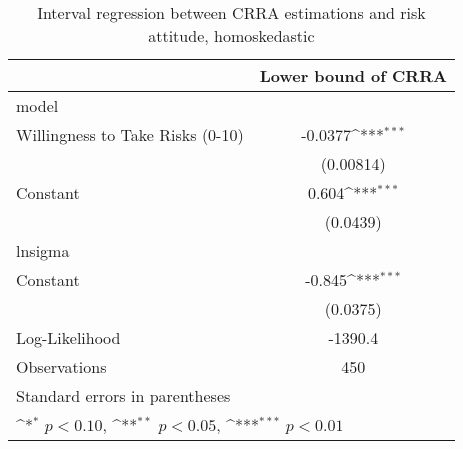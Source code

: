 \begin{table}[htbp]\centering
\def\sym#1{\ifmmode^{#1}\else\(^{#1}\)\fi}
\caption{Interval regression between CRRA estimations and risk attitude, homoskedastic}
\begin{tabular}{l*{1}{c}}
\hline\hline
                    &\multicolumn{1}{c}{Lower bound of CRRA}\\
\hline
model               &                     \\
Willingness to Take Risks (0-10)&     -0.0377\sym{***}\\
                    &   (0.00814)         \\
[1em]
Constant            &       0.604\sym{***}\\
                    &    (0.0439)         \\
\hline
lnsigma             &                     \\
Constant            &      -0.845\sym{***}\\
                    &    (0.0375)         \\
\hline
Log-Likelihood      &     -1390.4         \\
Observations        &         450         \\
\hline\hline
\multicolumn{2}{l}{\footnotesize Standard errors in parentheses}\\
\multicolumn{2}{l}{\footnotesize \sym{*} \(p<0.10\), \sym{**} \(p<0.05\), \sym{***} \(p<0.01\)}\\
\end{tabular}
\end{table}
